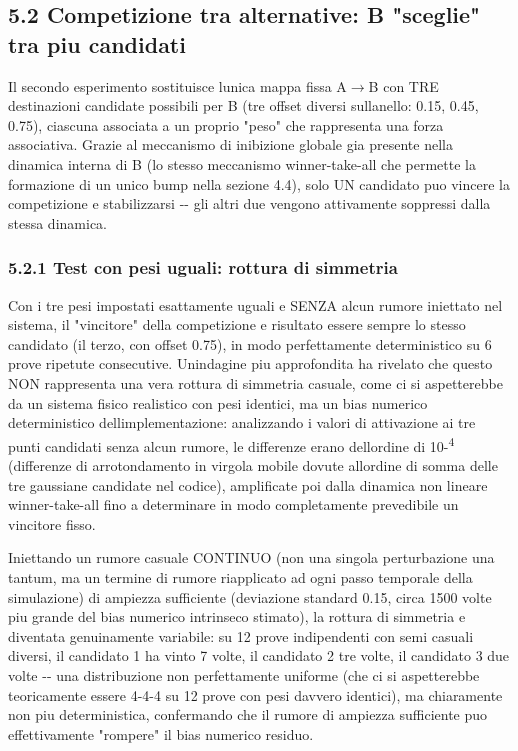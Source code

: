 \documentclass[
  italian,
]{article}
\begin{document}
\subsection{5.2 Competizione tra alternative: B "sceglie" tra piu\textquotesingle{} candidati}\label{competizione-tra-alternative-b-sceglie-tra-piu-candidati}

Il secondo esperimento sostituisce l\textquotesingle unica mappa fissa A$\rightarrow$B con TRE destinazioni candidate possibili per B (tre offset diversi sull\textquotesingle anello: 0.15, 0.45, 0.75), ciascuna associata a un proprio "peso" che rappresenta una forza associativa. Grazie al meccanismo di inibizione globale gia\textquotesingle{} presente nella dinamica interna di B (lo stesso meccanismo winner-take-all che permette la formazione di un unico bump nella sezione 4.4), solo UN candidato puo\textquotesingle{} vincere la competizione e stabilizzarsi -\/- gli altri due vengono attivamente soppressi dalla stessa dinamica.

\subsubsection{5.2.1 Test con pesi uguali: rottura di simmetria}\label{test-con-pesi-uguali-rottura-di-simmetria}

Con i tre pesi impostati esattamente uguali e SENZA alcun rumore iniettato nel sistema, il "vincitore" della competizione e\textquotesingle{} risultato essere sempre lo stesso candidato (il terzo, con offset 0.75), in modo perfettamente deterministico su 6 prove ripetute consecutive. Un\textquotesingle indagine piu\textquotesingle{} approfondita ha rivelato che questo NON rappresenta una vera rottura di simmetria casuale, come ci si aspetterebbe da un sistema fisico realistico con pesi identici, ma un bias numerico deterministico dell\textquotesingle implementazione: analizzando i valori di attivazione ai tre punti candidati senza alcun rumore, le differenze erano dell\textquotesingle ordine di 10-\textsuperscript{4} (differenze di arrotondamento in virgola mobile dovute all\textquotesingle ordine di somma delle tre gaussiane candidate nel codice), amplificate poi dalla dinamica non lineare winner-take-all fino a determinare in modo completamente prevedibile un vincitore fisso.

Iniettando un rumore casuale CONTINUO (non una singola perturbazione una tantum, ma un termine di rumore riapplicato ad ogni passo temporale della simulazione) di ampiezza sufficiente (deviazione standard 0.15, circa 1500 volte piu\textquotesingle{} grande del bias numerico intrinseco stimato), la rottura di simmetria e\textquotesingle{} diventata genuinamente variabile: su 12 prove indipendenti con semi casuali diversi, il candidato 1 ha vinto 7 volte, il candidato 2 tre volte, il candidato 3 due volte -\/- una distribuzione non perfettamente uniforme (che ci si aspetterebbe teoricamente essere 4-4-4 su 12 prove con pesi davvero identici), ma chiaramente non piu\textquotesingle{} deterministica, confermando che il rumore di ampiezza sufficiente puo\textquotesingle{} effettivamente "rompere" il bias numerico residuo.
\end{document}
